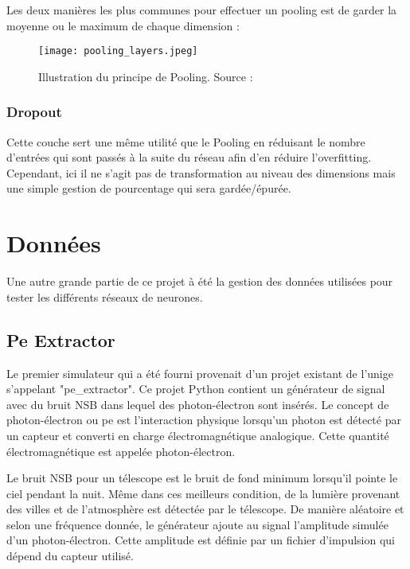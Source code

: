 Les deux manières les plus communes pour effectuer un pooling est de garder la moyenne ou le maximum de chaque dimension :

\begin{figure}[tbph!]
	\centering
	\texttt{[image: pooling\_layers.jpeg]}
	\caption[Illustration du principe de Pooling]{Illustration du principe de Pooling. Source : \cite{PoolingImage}}
\end{figure}

\subsubsection{Dropout}
Cette couche sert une même utilité que le Pooling en réduisant le nombre d'entrées qui sont passés à la suite du réseau afin d'en réduire l'overfitting.
Cependant, ici il ne s'agit pas de transformation au niveau des dimensions mais une simple gestion de pourcentage qui sera gardée/épurée.

\section{Données}

Une autre grande partie de ce projet à été la gestion des données utilisées pour tester les différents réseaux de neurones.

\subsection{Pe Extractor}

Le premier simulateur qui a été fourni provenait d'un projet existant de l'\gls{unige} s'appelant "pe\_extractor".
Ce projet Python contient un générateur de signal avec du bruit NSB dans lequel des photon-électron sont insérés.
Le concept de photon-électron ou \gls{pe} est l'interaction physique lorsqu'un photon est détecté par un capteur et converti en charge électromagnétique analogique.
Cette quantité électromagnétique est appelée photon-électron.

Le bruit NSB pour un télescope est le bruit de fond minimum lorsqu'il pointe le ciel pendant la nuit. Même dans ces meilleurs condition,
de la lumière provenant des villes et de l'atmosphère est détectée par le télescope. 
De manière aléatoire et selon une fréquence donnée, le générateur ajoute au signal l'amplitude simulée d'un photon-électron.
Cette amplitude est définie par un fichier d'impulsion qui dépend du capteur utilisé.

